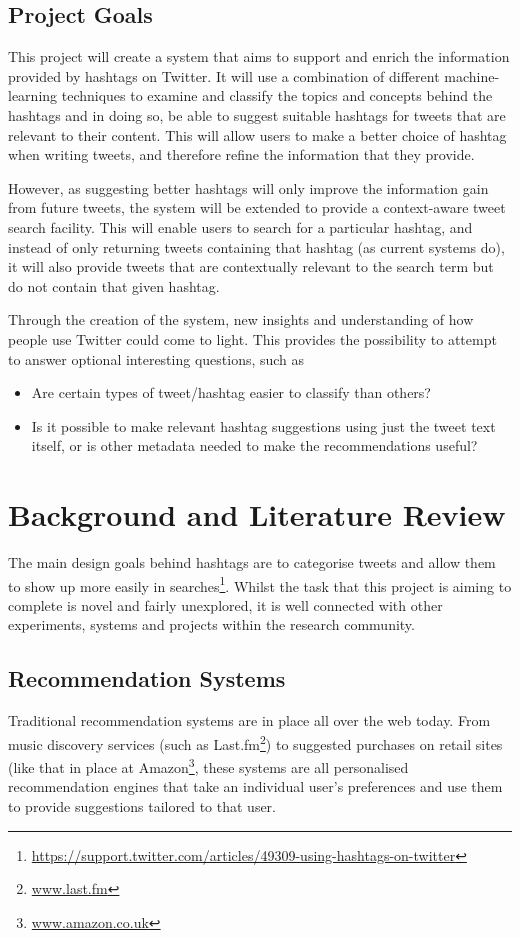 \documentclass[12pt,a4paper]{article}
\begin{document}
\subsection{Project Goals}
\label{sec:goals}
This project will create a system that aims to support and enrich the information provided by hashtags on Twitter. It will use a combination of different machine-learning techniques to examine and classify the topics and concepts behind the hashtags and in doing so, be able to suggest suitable hashtags for tweets that are relevant to their content. This will allow users to make a better choice of hashtag when writing tweets, and therefore refine the information that they provide.

However, as suggesting better hashtags will only improve the information gain from future tweets, the system will be extended to provide a context-aware tweet search facility. This will enable users to search for a particular hashtag, and instead of only returning tweets containing that hashtag (as current systems do), it will also provide tweets that are contextually relevant to the search term but do not contain that given hashtag.

Through the creation of the system, new insights and understanding of how people use Twitter could come to light. This provides the possibility to attempt to answer optional interesting questions, such as
\begin{itemize}
    \item Are certain types of tweet/hashtag easier to classify than others?
    \item Is it possible to make relevant hashtag suggestions using just the tweet text itself, or is other metadata needed to make the recommendations useful?
\end{itemize}

\pagebreak

\section{Background and Literature Review}
\label{sec:litreview}
The main design goals behind hashtags are to categorise tweets and allow them to show up more easily in searches\footnote{\url{https://support.twitter.com/articles/49309-using-hashtags-on-twitter}}. Whilst the task that this project is aiming to complete is novel and fairly unexplored, it is well connected with other experiments, systems and projects within the research community.

\subsection{Recommendation Systems}
Traditional recommendation systems are in place all over the web today. From music discovery services (such as Last.fm\footnote{\url{www.last.fm}}) to suggested purchases on retail sites (like that in place at Amazon\footnote{\url{www.amazon.co.uk}}, these systems are all personalised recommendation engines that take an individual user's preferences and use them to provide suggestions tailored to that user.
\end{document}
